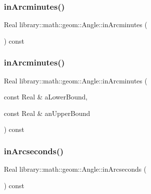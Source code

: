 \subsubsection{\texorpdfstring{in\+Arcminutes()}{inArcminutes()}\hspace{0.1cm}{\footnotesize\ttfamily [1/2]}}
{\footnotesize\ttfamily Real library\+::math\+::geom\+::\+Angle\+::in\+Arcminutes (\begin{DoxyParamCaption}{ }\end{DoxyParamCaption}) const}

\mbox{\label{classlibrary_1_1math_1_1geom_1_1_angle_ab6c337dacd75f1bc5c49df77780833c1}} 
\subsubsection{\texorpdfstring{in\+Arcminutes()}{inArcminutes()}\hspace{0.1cm}{\footnotesize\ttfamily [2/2]}}
{\footnotesize\ttfamily Real library\+::math\+::geom\+::\+Angle\+::in\+Arcminutes (\begin{DoxyParamCaption}\item[{const Real \&}]{a\+Lower\+Bound,  }\item[{const Real \&}]{an\+Upper\+Bound }\end{DoxyParamCaption}) const}

\mbox{\label{classlibrary_1_1math_1_1geom_1_1_angle_a2d285ab36453ff13c86689d799e97aa6}} 
\subsubsection{\texorpdfstring{in\+Arcseconds()}{inArcseconds()}\hspace{0.1cm}{\footnotesize\ttfamily [1/2]}}
{\footnotesize\ttfamily Real library\+::math\+::geom\+::\+Angle\+::in\+Arcseconds (\begin{DoxyParamCaption}{ }\end{DoxyParamCaption}) const}

